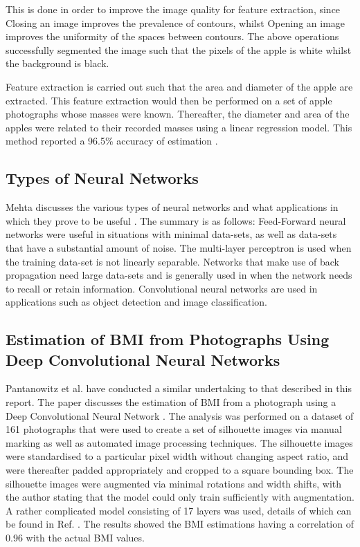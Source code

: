 \documentclass[conference]{IEEEtran}
\begin{document}
This is done in order to improve the image quality for feature extraction, since Closing an image improves the prevalence of contours, whilst Opening an image improves the uniformity of the spaces between contours.
The above operations successfully segmented the image such that the pixels of the apple is white whilst the background is black.

Feature extraction is carried out such that the area and diameter of the apple are extracted.
This feature extraction would then be performed on a set of apple photographs whose masses were known.
Thereafter, the diameter and area of the apples were related to their recorded masses using a linear regression model.
This method reported a 96.5\% accuracy of estimation \cite{comert}.

\subsection{Types of Neural Networks}
Mehta discusses the various types of neural networks and what applications in which they prove to be useful \cite{mehta_2019}. 
The summary is as follows:
Feed-Forward neural networks were useful in situations with minimal data-sets, as well as data-sets that have a substantial amount of noise.
The multi-layer perceptron is used when the training data-set is not linearly separable.
Networks that make use of back propagation need large data-sets and is generally used in when the network needs to recall or retain information.
Convolutional neural networks are used in applications such as object detection and image classification.

\subsection{Estimation of BMI from Photographs Using Deep Convolutional Neural Networks}
Pantanowitz et al. have conducted a similar undertaking to that described in this report.
The paper discusses the estimation of BMI from a photograph using a Deep Convolutional Neural Network \cite{bmifromphoto}.
The analysis was performed on a dataset of 161 photographs that were used to create a set of silhouette images via manual marking as well as automated image processing techniques.
The silhouette images were standardised to a particular pixel width without changing aspect ratio, and were thereafter padded appropriately and cropped to a square bounding box.
The silhouette images were augmented via minimal rotations and width shifts, with the author stating that the model could only train sufficiently with augmentation.
A rather complicated model consisting of 17 layers was used, details of which can be found in Ref. \cite{bmifromphoto}.
The results showed the BMI estimations having a correlation of 0.96 with the actual BMI values.
\end{document}
